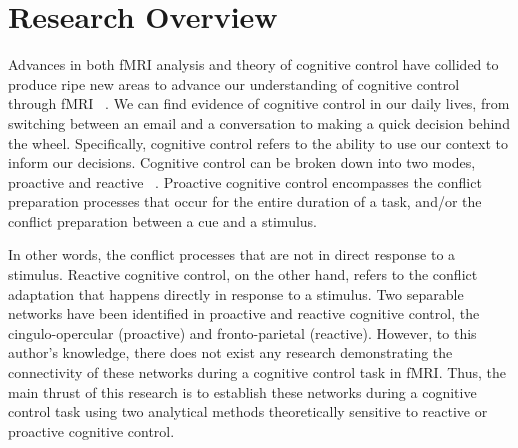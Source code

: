 \documentclass[phd,appendix,figures]{uithesis}
\begin{document}
\begin{itemize}
\begin{itemize}
\end{itemize}


\chapter{Research Overview}

Advances in both fMRI analysis and theory of cognitive control have collided to produce ripe new areas to advance our understanding of cognitive control through fMRI ~\citep{Braver2012,Rissman2004,Mumford2012,Cisler2012}.
We can find evidence of cognitive control in our daily lives, from switching between an email and a conversation to making a quick decision behind the wheel. 
Specifically, cognitive control refers to the ability to use our context to inform our decisions. Cognitive control can be broken down into two modes, proactive and reactive ~\citep{Braver2012}. 
Proactive cognitive control encompasses the conflict preparation processes that occur for the entire duration of a task, and/or the conflict preparation between a cue and a stimulus.

In other words, the conflict processes that are not in direct response to a stimulus.
Reactive cognitive control, on the other hand, refers to the conflict adaptation that happens directly in response to a stimulus.
Two separable networks have been identified in proactive and reactive cognitive control, the cingulo-opercular (proactive) and fronto-parietal (reactive).
However, to this author's knowledge, there does not exist any research demonstrating the connectivity of these networks during a cognitive control task in fMRI.
Thus, the main thrust of this research is to establish these networks during a cognitive control task using two analytical methods theoretically sensitive to reactive or proactive cognitive control.


\end{itemize}
\end{document}
